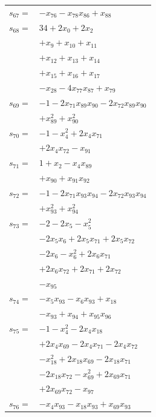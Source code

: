 \begin{longtable}{@{}r@{\;}l@{}}
\(s_{67}=\) & \(\displaystyle -x_{76} -x_{78}x_{86} +x_{88}\) \\[3pt]
\(s_{68}=\) & \(\displaystyle 34 +2x_{0} +2x_{2}\) \\
 & \(\displaystyle +x_{9} +x_{10} +x_{11}\) \\
 & \(\displaystyle +x_{12} +x_{13} +x_{14}\) \\
 & \(\displaystyle +x_{15} +x_{16} +x_{17}\) \\
 & \(\displaystyle -x_{28} -4x_{77}x_{87} +x_{79}\) \\[3pt]
\(s_{69}=\) & \(\displaystyle -1 -2x_{71}x_{89}x_{90} -2x_{72}x_{89}x_{90}\) \\
 & \(\displaystyle +x_{89}^{2} +x_{90}^{2}\) \\[3pt]
\(s_{70}=\) & \(\displaystyle -1 -x_{4}^{2} +2x_{4}x_{71}\) \\
 & \(\displaystyle +2x_{4}x_{72} -x_{91}\) \\[3pt]
\(s_{71}=\) & \(\displaystyle 1 +x_{2} -x_{4}x_{89}\) \\
 & \(\displaystyle +x_{90} +x_{91}x_{92}\) \\[3pt]
\(s_{72}=\) & \(\displaystyle -1 -2x_{71}x_{93}x_{94} -2x_{72}x_{93}x_{94}\) \\
 & \(\displaystyle +x_{93}^{2} +x_{94}^{2}\) \\[3pt]
\(s_{73}=\) & \(\displaystyle -2 -2x_{5} -x_{5}^{2}\) \\
 & \(\displaystyle -2x_{5}x_{6} +2x_{5}x_{71} +2x_{5}x_{72}\) \\
 & \(\displaystyle -2x_{6} -x_{6}^{2} +2x_{6}x_{71}\) \\
 & \(\displaystyle +2x_{6}x_{72} +2x_{71} +2x_{72}\) \\
 & \(\displaystyle -x_{95}\) \\[3pt]
\(s_{74}=\) & \(\displaystyle -x_{5}x_{93} -x_{6}x_{93} +x_{18}\) \\
 & \(\displaystyle -x_{93} +x_{94} +x_{95}x_{96}\) \\[3pt]
\(s_{75}=\) & \(\displaystyle -1 -x_{4}^{2} -2x_{4}x_{18}\) \\
 & \(\displaystyle +2x_{4}x_{69} -2x_{4}x_{71} -2x_{4}x_{72}\) \\
 & \(\displaystyle -x_{18}^{2} +2x_{18}x_{69} -2x_{18}x_{71}\) \\
 & \(\displaystyle -2x_{18}x_{72} -x_{69}^{2} +2x_{69}x_{71}\) \\
 & \(\displaystyle +2x_{69}x_{72} -x_{97}\) \\[3pt]
\(s_{76}=\) & \(\displaystyle -x_{4}x_{93} -x_{18}x_{93} +x_{69}x_{93}\) \\

\end{longtable}
